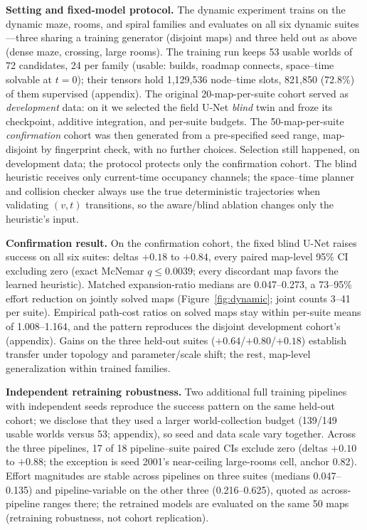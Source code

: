 \documentclass[letterpaper]{article} %
\begin{document}
\textbf{Setting and fixed-model protocol.} The dynamic experiment trains on the dynamic maze, rooms, and spiral families and evaluates on all six dynamic suites---three sharing a training generator (disjoint maps) and three held out as above (dense maze, crossing, large rooms). The training run keeps 53 usable worlds of 72 candidates, 24 per family (usable: builds, roadmap connects, space--time solvable at $t{=}0$); their tensors hold 1{,}129{,}536 node--time slots, 821{,}850 (72.8\%) of them supervised (appendix). The original 20-map-per-suite cohort served as \emph{development} data: on it we selected the field U-Net \emph{blind} twin and froze its checkpoint, additive integration, and per-suite budgets. The 50-map-per-suite \emph{confirmation} cohort was then generated from a pre-specified seed range, map-disjoint by fingerprint check, with no further choices. Selection still happened, on development data; the protocol protects only the confirmation cohort. The blind heuristic receives only current-time occupancy channels; the space--time planner and collision checker always use the true deterministic trajectories when validating $(v,t)$ transitions, so the aware/blind ablation changes only the heuristic's input.

\textbf{Confirmation result.} On the confirmation cohort, the fixed blind U-Net raises success on all six suites: deltas $+0.18$ to $+0.84$, every paired map-level 95\% CI excluding zero (exact McNemar $q \leq 0.0039$; every discordant map favors the learned heuristic). Matched expansion-ratio medians are 0.047--0.273, a 73--95\% effort reduction on jointly solved maps (Figure~\ref{fig:dynamic}; joint counts 3--41 per suite). Empirical path-cost ratios on solved maps stay within per-suite means of 1.008--1.164, and the pattern reproduces the disjoint development cohort's (appendix). Gains on the three held-out suites ($+0.64$/$+0.80$/$+0.18$) establish transfer under topology and parameter/scale shift; the rest, map-level generalization within trained families.

\textbf{Independent retraining robustness.} Two additional full training pipelines with independent seeds reproduce the success pattern on the same held-out cohort; we disclose that they used a larger world-collection budget (139/149 usable worlds versus 53; appendix), so seed and data scale vary together. Across the three pipelines, 17 of 18 pipeline--suite paired CIs exclude zero (deltas $+0.10$ to $+0.88$; the exception is seed 2001's near-ceiling large-rooms cell, anchor 0.82). Effort magnitudes are stable across pipelines on three suites (medians 0.047--0.135) and pipeline-variable on the other three (0.216--0.625), quoted as across-pipeline ranges there; the retrained models are evaluated on the same 50 maps (retraining robustness, not cohort replication).
\end{document}
